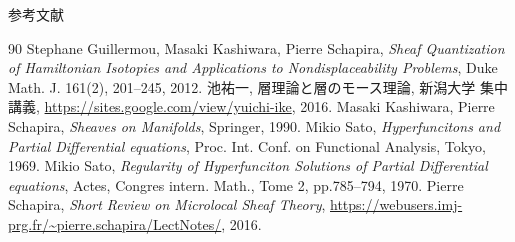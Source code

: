 \documentclass[dvipdfmx,10pt,aspectratio=169,leqno]{beamer}%
\numberwithin{equation}{subsection}
\theoremstyle{mystyle}
\begin{document}
\begin{frame}[allowframebreaks]{参考文献}
    \begin{thebibliography}{90}\beamertemplatetextbibitems
         Stephane Guillermou, 
        Masaki Kashiwara, Pierre Schapira, 
        \textit{Sheaf Quantization of Hamiltonian Isotopies 
        and Applications to Nondisplaceability Problems}, 
        Duke Math. J. 161(2), 201--245, 2012.
         池祐一, 層理論と層のモース理論, 
        新潟大学 集中講義, 
        \url{https://sites.google.com/view/yuichi-ike}, 2016.
         Masaki Kashiwara, Pierre Schapira, 
        \textit{Sheaves on Manifolds}, Springer, 1990.
         Mikio Sato, 
        \textit{Hyperfuncitons and 
        Partial Differential equations}, 
        Proc. Int. Conf. on Functional Analysis, Tokyo, 1969.
         Mikio Sato, 
        \textit{Regularity of Hyperfunciton Solutions of 
        Partial Differential equations}, 
        Actes, Congres intern. Math., 
        Tome 2, pp.785--794, 1970.
         Pierre Schapira, 
        \textit{Short Review on Microlocal Sheaf Theory}, 
        \url{https://webusers.imj-prg.fr/~pierre.schapira/LectNotes/}, 2016.
    \end{thebibliography}
\end{frame}

\end{document}
